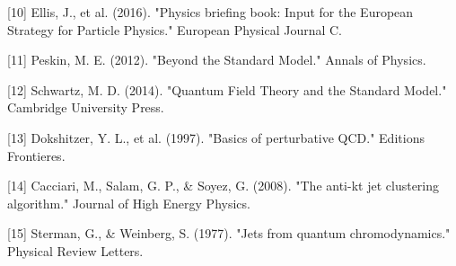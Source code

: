 \documentclass{article}
\begin{document}
[10] Ellis, J., et al. (2016). "Physics briefing book: Input for the European Strategy for Particle Physics." European Physical Journal C.

[11] Peskin, M. E. (2012). "Beyond the Standard Model." Annals of Physics.

[12] Schwartz, M. D. (2014). "Quantum Field Theory and the Standard Model." Cambridge University Press.

[13] Dokshitzer, Y. L., et al. (1997). "Basics of perturbative QCD." Editions Frontieres.

[14] Cacciari, M., Salam, G. P., \& Soyez, G. (2008). "The anti-kt jet clustering algorithm." Journal of High Energy Physics.

[15] Sterman, G., \& Weinberg, S. (1977). "Jets from quantum chromodynamics." Physical Review Letters.
\end{document}
